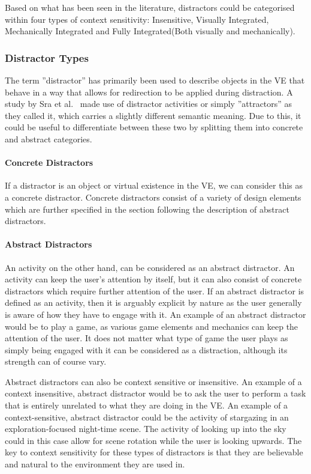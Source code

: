 Based on what has been seen in the literature, distractors could be categorised within four types of context sensitivity: Insensitive, Visually Integrated, Mechanically Integrated and Fully Integrated(Both visually and mechanically).

\subsubsection{Distractor Types}
The term ''distractor'' has primarily been used to describe objects in the VE that behave in a way that allows for redirection to be applied during distraction. A study by Sra et al.~\cite{sra2018vmotion} made use of distractor activities or simply ''attractors'' as they called it, which carries a slightly different semantic meaning. Due to this, it could be useful to differentiate between these two by splitting them into concrete and abstract categories.

\paragraph{Concrete Distractors}
If a distractor is an object or virtual existence in the VE, we can consider this as a concrete distractor. Concrete distractors consist of a variety of design elements which are further specified in the section following the description of abstract distractors. 

\paragraph{Abstract Distractors}
An activity on the other hand, can be considered as an abstract distractor. An activity can keep the user's attention by itself, but it can also consist of concrete distractors which require further attention of the user. If an abstract distractor is defined as an activity, then it is arguably explicit by nature as the user generally is aware of how they have to engage with it. An example of an abstract distractor would be to play a game, as various game elements and mechanics can keep the attention of the user. It does not matter what type of game the user plays as simply being engaged with it can be considered as a distraction, although its strength can of course vary. 

Abstract distractors can also be context sensitive or insensitive. An example of a context insensitive, abstract distractor would be to ask the user to perform a task that is entirely unrelated to what they are doing in the VE. An example of a context-sensitive, abstract distractor could be the activity of stargazing in an exploration-focused night-time scene. The activity of looking up into the sky could in this case allow for scene rotation while the user is looking upwards. The key to context sensitivity for these types of distractors is that they are believable and natural to the environment they are used in. 

